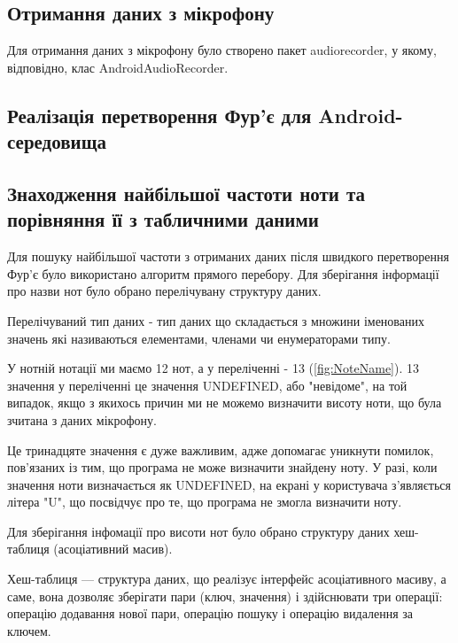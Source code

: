 \subsection{Отримання даних з мікрофону}

Для отримання даних з мікрофону було створено пакет audiorecorder, у якому, відповідно, клас AndroidAudioRecorder.

\subsection{Реалізація перетворення Фур'є для Android-середовища}


\subsection{Знаходження найбільшої частоти ноти та порівняння її з табличними даними}

Для пошуку найбільшої частоти з отриманих даних після швидкого перетворення Фур'є було використано алгоритм прямого перебору. Для зберігання інформації про назви нот було обрано перелічувану структуру даних.

Перелічуваний тип даних - тип даних що складається з множини іменованих значень які називаються елементами, членами чи енумераторами типу.

У нотній нотації ми маємо 12 нот, а у переліченні - 13 (\ref{fig:NoteName}). 13 значення у переліченні це значення UNDEFINED, або "невідоме", на той випадок, якщо з якихось причин ми не можемо визначити висоту ноти, що була зчитана з даних мікрофону. 

Це тринадцяте значення є дуже важливим, адже допомагає уникнути помилок, пов'язаних із тим, що програма не може визначити знайдену ноту. У разі, коли значення ноти визначається як UNDEFINED, на екрані у користувача з'являється літера "U", що посвідчує про те, що програма не змогла визначити ноту.

Для зберігання інфомації про висоти нот було обрано структуру даних хеш-таблиця 
(асоціативний масив).

Хеш-таблиця — структура даних, що реалізує інтерфейс асоціативного масиву, а саме, вона дозволяє зберігати пари (ключ, значення) і здійснювати три операції: операцію додавання нової пари, операцію пошуку і операцію видалення за ключем.

